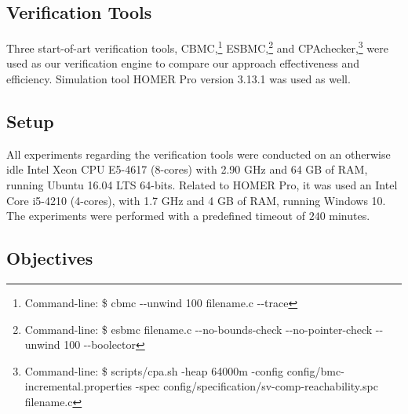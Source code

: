 \documentclass[review]{elsarticle}
\begin{document}
\subsection{Verification Tools} 

Three start-of-art verification tools, CBMC,\footnote{Command-line: \$ cbmc -\phantom{}-unwind 100 filename.c -\phantom{}-trace} ESBMC,\footnote{Command-line: \$ esbmc filename.c -\phantom{}-no-bounds-check -\phantom{}-no-pointer-check -\phantom{}-unwind 100 -\phantom{}-boolector} %
and CPAchecker,\footnote{Command-line: \$ scripts/cpa.sh -heap 64000m -config config/bmc-incremental.properties -spec config/specification/sv-comp-reachability.spc filename.c} were used as our verification engine to compare our approach effectiveness and efficiency. Simulation tool HOMER Pro version 3.13.1 was used as well.

\subsection{Setup} 

All experiments regarding the verification tools were conducted on an otherwise idle Intel Xeon CPU E5-4617 (8-cores) with 2.90 GHz and 64 GB of RAM, running Ubuntu 16.04 LTS 64-bits. Related to HOMER Pro, it was used an Intel Core i5-4210 (4-cores), with 1.7 GHz and 4 GB of RAM, running Windows 10. The experiments were performed with a predefined timeout of $240$ minutes.

\subsection{Objectives} 
\end{document}
